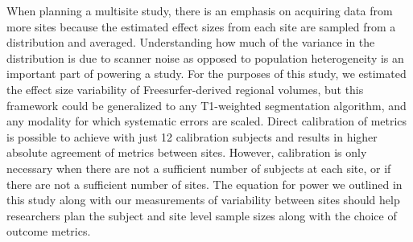 When planning a multisite study, there is an emphasis on acquiring data from more sites because the estimated effect sizes from each site are sampled from a distribution and averaged. Understanding how much of the variance in the distribution is due to scanner noise as opposed to population heterogeneity is an important part of powering a study. For the purposes of this study, we estimated the effect size variability of Freesurfer-derived regional volumes, but this framework could be generalized to any T1-weighted segmentation algorithm, and any modality for which systematic errors are scaled. Direct calibration of metrics is possible to achieve with just 12 calibration subjects and results in higher absolute agreement of metrics between sites. However, calibration is only necessary when there are not a sufficient number of subjects at each site, or if there are not a sufficient number of sites. The equation for power we outlined in this study along with our measurements of variability between sites should help researchers plan the subject and site level sample sizes along with the choice of outcome metrics. %